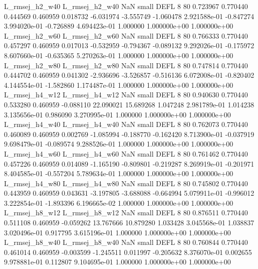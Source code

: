 L_rmsej_h2_w40 L_rmsej_h2_w40                   NaN      small     DEFL                 8 80 0.723967       0.770440 0.444569       0.460959    0.018732     -6.031974     -3.555749    -1.060478   2.921588e-01 -0.847274 3.994020e-01    -0.726889   4.694423e-01            1.000000    1.000000e+00        1.000000e+00
L_rmsej_h2_w60 L_rmsej_h2_w60                   NaN      small     DEFL                 8 80 0.766333       0.770440 0.457297       0.460959    0.017013     -0.532959     -0.794367    -0.089132   9.292026e-01 -0.175972 8.607660e-01    -0.635365   5.270263e-01            1.000000    1.000000e+00        1.000000e+00
L_rmsej_h2_w80 L_rmsej_h2_w80                   NaN      small     DEFL                 8 80 0.747814       0.770440 0.444702       0.460959    0.041302     -2.936696     -3.526857    -0.516136   6.072008e-01 -0.820402 4.144554e-01    -1.582860   1.174487e-01            1.000000    1.000000e+00        1.000000e+00
L_rmsej_h4_w12 L_rmsej_h4_w12                   NaN      small     DEFL                 8 80 0.940630       0.770440 0.533280       0.460959   -0.088110     22.090021     15.689268     1.047248   2.981789e-01  1.014238 3.135656e-01     0.986090   3.270995e-01            1.000000    1.000000e+00        1.000000e+00
L_rmsej_h4_w40 L_rmsej_h4_w40                   NaN      small     DEFL                 8 80 0.762073       0.770440 0.460089       0.460959    0.002769     -1.085994     -0.188770    -0.162420   8.713900e-01 -0.037919 9.698479e-01    -0.089574   9.288526e-01            1.000000    1.000000e+00        1.000000e+00
L_rmsej_h4_w60 L_rmsej_h4_w60                   NaN      small     DEFL                 8 80 0.761462       0.770440 0.457226       0.460959    0.014089     -1.165190     -0.809801    -0.219287   8.269919e-01 -0.201971 8.404585e-01    -0.557204   5.789634e-01            1.000000    1.000000e+00        1.000000e+00
L_rmsej_h4_w80 L_rmsej_h4_w80                   NaN      small     DEFL                 8 80 0.745802       0.770440 0.443959       0.460959    0.043631     -3.197805     -3.688088    -0.664994   5.079911e-01 -0.996012 3.222854e-01    -1.893396   6.196665e-02            1.000000    1.000000e+00        1.000000e+00
L_rmsej_h8_w12 L_rmsej_h8_w12                   NaN      small     DEFL                 8 80 0.876511       0.770440 0.511108       0.460959   -0.059262     13.767666     10.879280     1.033428   3.045568e-01  1.038837 3.020496e-01     0.917795   3.615196e-01            1.000000    1.000000e+00        1.000000e+00
L_rmsej_h8_w40 L_rmsej_h8_w40                   NaN      small     DEFL                 8 80 0.760844       0.770440 0.461014       0.460959   -0.003599     -1.245511      0.011997    -0.205632   8.376070e-01  0.002655 9.978881e-01     0.112807   9.104695e-01            1.000000    1.000000e+00        1.000000e+00
